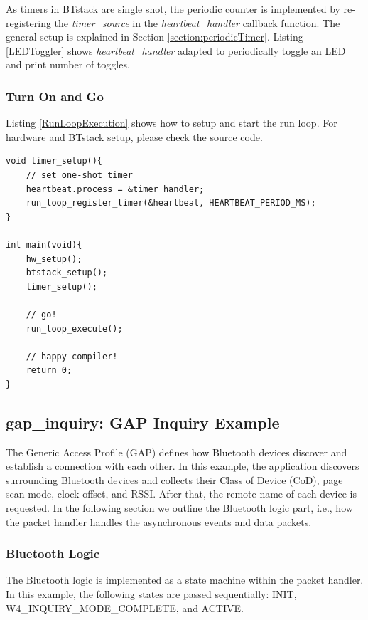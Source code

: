 \documentclass[a4paper,titlepage,oneside,12pt]{amsart} %
\begin{document}
As timers in BTstack are single shot, the periodic counter is implemented by re-registering the \emph{timer\_source} in the \emph{heartbeat\_handler} callback function. The general setup is explained in Section \ref{section:periodicTimer}. Listing \ref{LEDToggler} shows \emph{heartbeat\_handler} adapted to periodically toggle an LED and print number of toggles.


\subsubsection{Turn On and Go}

Listing \ref{RunLoopExecution} shows how to setup and start the run loop. For hardware and BTstack setup, please check the source code. 

\begin{lstlisting}[float, caption= Run loop execution., label=RunLoopExecution]
void timer_setup(){
    // set one-shot timer
    heartbeat.process = &timer_handler;
    run_loop_register_timer(&heartbeat, HEARTBEAT_PERIOD_MS);
}

int main(void){
    hw_setup();
    btstack_setup();
    timer_setup();
    
    // go!
    run_loop_execute(); 
    
    // happy compiler!
    return 0;
}
\end{lstlisting}

    
\subsection{gap\_inquiry: GAP Inquiry Example}
\label{example:GapInquiry}

The Generic Access Profile (GAP) defines how Bluetooth devices discover and establish a connection with each other. In this example, the application discovers  surrounding Bluetooth devices and collects their Class of Device (CoD), page scan mode, clock offset, and RSSI. After that, the remote name of each device is requested. In the following section we outline the Bluetooth logic part, i.e., how the packet handler handles the asynchronous events and data packets.

\subsubsection{Bluetooth Logic}
The Bluetooth logic is implemented as a state machine within the packet handler. In this example, the following states are passed sequentially: INIT, W4\_INQUIRY\_MODE\_COMPLETE, and ACTIVE. 
\end{document}
